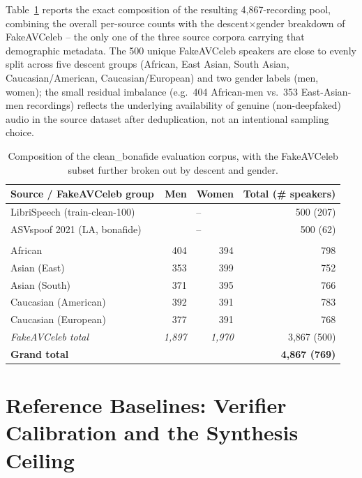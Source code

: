 \documentclass[11pt]{article}
\begin{document}
Table~\ref{tab:dataset} reports the exact composition of the resulting
4,867-recording pool, combining the overall per-source counts with the
descent$\times$gender breakdown of FakeAVCeleb -- the only one of the
three source corpora carrying that demographic metadata. The 500
unique FakeAVCeleb speakers are close to evenly split across five
descent groups (African, East Asian, South Asian, Caucasian/American,
Caucasian/European) and two gender labels (men, women); the small
residual imbalance (e.g.\ 404 African-men vs.\ 353 East-Asian-men
recordings) reflects the underlying availability of genuine
(non-deepfaked) audio in the source dataset after deduplication, not
an intentional sampling choice.

\begin{table}[H]
\centering
\caption{Composition of the clean\_bonafide evaluation corpus, with the
FakeAVCeleb subset further broken out by descent and gender.}
\label{tab:dataset}
\begin{tabular}{lrrr}
\toprule
Source / FakeAVCeleb group & Men & Women & Total (\# speakers) \\
\midrule
LibriSpeech (train-clean-100)         & \multicolumn{2}{c}{--} & 500 (207) \\
ASVspoof 2021 (LA, bonafide)          & \multicolumn{2}{c}{--} & 500 (62) \\
\addlinespace
\multicolumn{4}{l}{\textit{FakeAVCeleb, by descent:}} \\
\quad African                    & 404 & 394 & 798 \\
\quad Asian (East)               & 353 & 399 & 752 \\
\quad Asian (South)              & 371 & 395 & 766 \\
\quad Caucasian (American)       & 392 & 391 & 783 \\
\quad Caucasian (European)       & 377 & 391 & 768 \\
\quad \textit{FakeAVCeleb total} & \textit{1{,}897} & \textit{1{,}970} & 3{,}867 (500) \\
\midrule
\textbf{Grand total}             & & & \textbf{4{,}867 (769)} \\
\bottomrule
\end{tabular}
\end{table}

\section{Reference Baselines: Verifier Calibration and the Synthesis Ceiling}
\label{sec:baselines}
\end{document}
